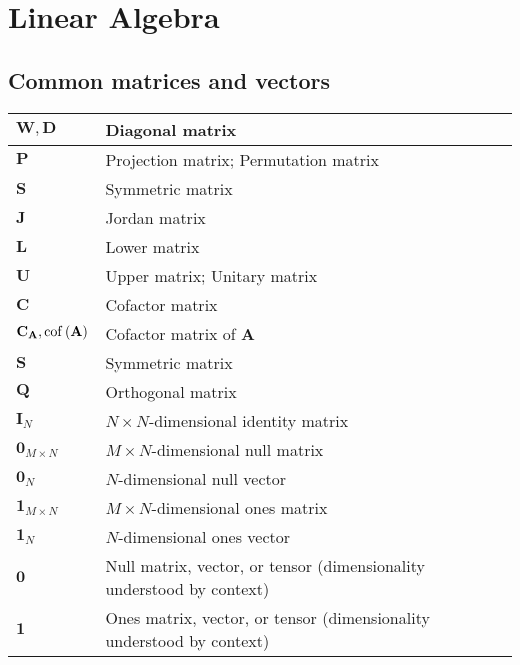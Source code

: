 \section{Linear Algebra}
\subsection{Common matrices and vectors}
\begin{xltabular}{\textwidth}{XX}
	\(\mathbf{W}, \mathbf{D}\)                  & Diagonal matrix                                                       \\ \hline
	\(\mathbf{P}\)                              & Projection matrix; Permutation matrix                                 \\ \hline
	\(\mathbf{S}\)                              & Symmetric matrix                                                      \\ \hline
	\(\mathbf{J}\)                              & Jordan matrix                                                         \\ \hline
	\(\mathbf{L}\)                              & Lower matrix                                                          \\ \hline
	\(\mathbf{U}\)                              & Upper matrix; Unitary matrix                                          \\ \hline
	\(\mathbf{C}\)                              & Cofactor matrix                                                       \\ \hline
	\(\mathbf{C}_\mathbf{A}, \operatorname{cof}\left(\mathbf{A}\right)\) & Cofactor matrix of \(\mathbf{A}\)                                     \\ \hline
	\(\mathbf{S}\)                              & Symmetric matrix                                                      \\ \hline
	\(\mathbf{Q}\)                              & Orthogonal matrix                                                     \\ \hline
	\(\mathbf{I}_N\)                            & \(N\times N\)-dimensional identity matrix                             \\ \hline
	\(\mathbf{0}_{M\times N}\)                  & \(M\times N\)-dimensional null matrix                                 \\ \hline
	\(\mathbf{0}_{N}\)                          & \(N\)-dimensional null vector                                         \\ \hline
	\(\mathbf{1}_{M\times N}\)                  & \(M\times N\)-dimensional ones matrix                                 \\ \hline
	\(\mathbf{1}_{N}\)                          & \(N\)-dimensional ones vector                                         \\ \hline
	\(\mathbf{0}\)                              & Null matrix, vector, or tensor (dimensionality understood by context) \\ \hline
	\(\mathbf{1}\)                              & Ones matrix, vector, or tensor (dimensionality understood by context) \\
\end{xltabular}

